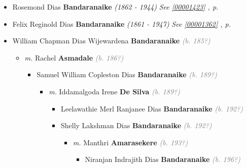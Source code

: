 \documentclass[10pt, openany]{book}
\begin{document}
\begin{itemize}
{\begin{itemize}
{\begin{itemize}
{\begin{itemize}
{\begin{itemize}
{\begin{itemize}
{   }
\end{itemize}}
\end{itemize}
   }
\end{itemize}}
\end{itemize}
  }
\item{Rosemond Dias \textbf{Bandaranaike} \textcolor{slorange}{\textit{(1862 - 1944)}} \textcolor{slteal}{\textit{See  \autoref{00001423} \textit{, p. \pageref{00001423} }}}}
\item{Felix Reginold Dias \textbf{Bandaranaike} \textcolor{slorange}{\textit{(1861 - 1947)}} \textcolor{slteal}{\textit{See  \autoref{00001362} \textit{, p. \pageref{00001362} }}}}
\item{William Chapman Dias Wijewardena \textbf{Bandaranaike} \textcolor{gray}{\textit{(b. 185?)}}
\begin{itemize}
\item{\textit{m.} Rachel \textbf{Asmadale} \textcolor{gray}{\textit{(b. 186?)}}   \label{couple:00001349:00001350} \begin{itemize}
\item{Samuel William Copleston Dias \textbf{Bandaranaike} \textcolor{gray}{\textit{(b. 189?)}}
\begin{itemize}
\item{\textit{m.} Iddamalgoda Irene \textbf{De Silva} \textcolor{gray}{\textit{(b. 189?)}}   \label{couple:00001351:00001352} \begin{itemize}
\item{Leelawathie Merl Ranjanee Dias \textbf{Bandaranaike} \textcolor{gray}{\textit{(b. 192?)}}
    }
\item{Shelly Lakshman Dias \textbf{Bandaranaike} \textcolor{gray}{\textit{(b. 192?)}}
\begin{itemize}
\item{\textit{m.} Manthri \textbf{Amarasekere} \textcolor{gray}{\textit{(b. 193?)}}   \label{couple:00001353:00001354} \begin{itemize}
\item{Niranjan Indrajith Dias \textbf{Bandaranaike} \textcolor{gray}{\textit{(b. 196?)}}
   }
\end{itemize}}
\end{itemize}
   }

\end{itemize}}
\end{itemize}}
\end{itemize}}
\end{itemize}}
\end{itemize}}
\end{itemize}
\end{document}
